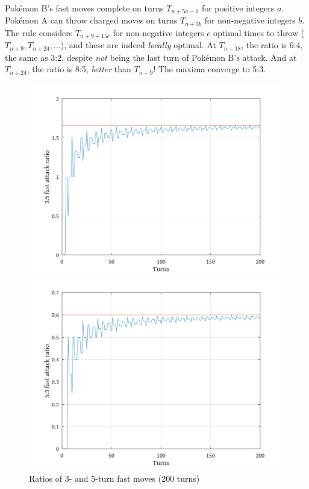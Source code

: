 Pokémon B's fast moves complete on turns $T_{n+5a-1}$ for positive integers $a$.
Pokémon A can throw charged moves on turns $T_{n+3b}$ for non-negative integers $b$.
The rule considers $T_{n+9+15c}$ for non-negative integers $c$ optimal times to throw
 ($T_{n+9}, T_{n+24}, \dots$), and these are indeed \textit{locally} optimal.
At $T_{n+18}$, the ratio is 6:4, the same as 3:2, despite \textit{not} being the last turn of Pokémon B's attack.
And at $T_{n+24}$, the ratio is 8:5, \textit{better} than $T_{n+9}$!
The maxima converge to 5:3.

\begin{figure}
\begin{minipage}{0.5\textwidth}\centering
\includegraphics[width=\textwidth,keepaspectratio]{octave/3vs5fastcharged.png}
\end{minipage}
\begin{minipage}{0.5\textwidth}\centering
\includegraphics[width=\textwidth,keepaspectratio]{octave/5vs3fastcharged.png}
\end{minipage}
\caption{Ratios of 3- and 5-turn fast moves (200 turns)\label{figure:35ratios}}
\end{figure}

